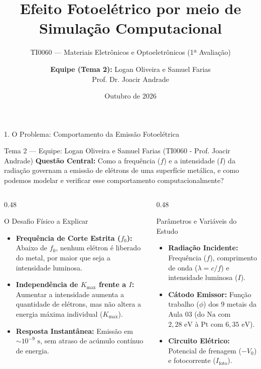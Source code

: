 \documentclass[aspectratio=169, 10pt]{beamer}
\title[Efeito Fotoelétrico — Tema 2]{Efeito Fotoelétrico por meio de Simulação Computacional}
\subtitle{TI0060 — Materiais Eletrônicos e Optoeletrônicos (1ª Avaliação)}
\author[Logan Oliveira e Samuel Farias]{\textbf{Equipe (Tema 2):} Logan Oliveira e Samuel Farias \\ \vspace{0.15cm} {\small Prof. Dr. Joacir Andrade}}
\institute[UFC]{Universidade Federal do Ceará (UFC) \\ Engenharia de Telecomunicações — 2026.2}
\date{Outubro de 2026}
\begin{document}
\begin{frame}{1. O Problema: Comportamento da Emissão Fotoelétrica}
  \vspace{-0.15cm}
  \begin{block}{Tema 2 — Equipe: Logan Oliveira e Samuel Farias (TI0060 - Prof. Joacir Andrade)}
    \textbf{Questão Central:} Como a frequência ($f$) e a intensidade ($I$) da radiação governam a emissão de elétrons de uma superfície metálica, e como podemos modelar e verificar esse comportamento computacionalmente?
  \end{block}

  \vspace{0.1cm}
  \begin{columns}[T]
    \begin{column}{0.48\textwidth}
      \begin{alertblock}{O Desafio Físico a Explicar}
        \footnotesize
        \begin{itemize}
          \item \textbf{Frequência de Corte Estrita ($f_0$):} Abaixo de $f_0$, nenhum elétron é liberado do metal, por maior que seja a intensidade luminosa.
          \item \textbf{Independência de $K_{\max}$ frente a $I$:} Aumentar a intensidade aumenta a quantidade de elétrons, mas não altera a energia máxima individual ($K_{\max}$).
          \item \textbf{Resposta Instantânea:} Emissão em $\sim 10^{-9}\text{ s}$, sem atraso de acúmulo contínuo de energia.
        \end{itemize}
      \end{alertblock}
    \end{column}

    \begin{column}{0.48\textwidth}
      \begin{exampleblock}{Parâmetros e Variáveis do Estudo}
        \footnotesize
        \begin{itemize}
          \item \textbf{Radiação Incidente:} Frequência ($f$), comprimento de onda ($\lambda = c/f$) e intensidade luminosa ($I$).
          \item \textbf{Cátodo Emissor:} Função trabalho ($\phi$) dos 9 metais da Aula 03 (do $\text{Na}$ com $2{,}28\text{ eV}$ à $\text{Pt}$ com $6{,}35\text{ eV}$).
          \item \textbf{Circuito Elétrico:} Potencial de frenagem ($-V_0$) e fotocorrente ($I_{\text{foto}}$).
        \end{itemize}
      \end{exampleblock}
    \end{column}
  \end{columns}
\end{frame}
\end{document}
